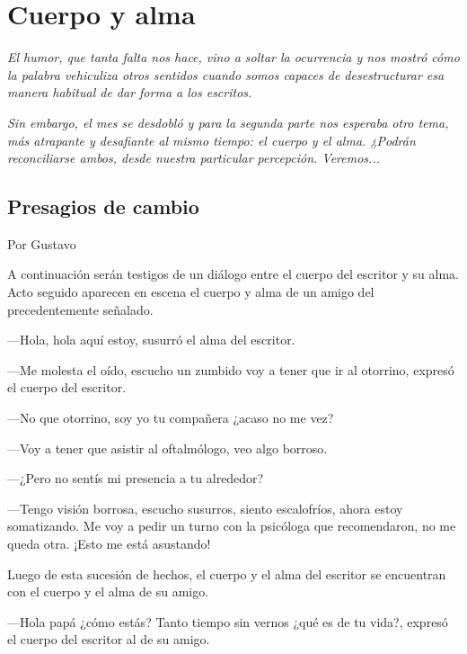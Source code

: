 \documentclass[11pt,twoside,openright,a5paper]{book}
\begin{document}
\chapter*{Cuerpo y alma}

\emph{El humor, que tanta falta nos hace, vino a soltar la ocurrencia y nos mostró cómo la palabra vehiculiza  otros sentidos cuando somos capaces de desestructurar esa manera habitual de dar forma a los escritos.}

\emph{Sin embargo, el mes se desdobló y para la segunda parte nos esperaba otro tema, más atrapante y desafiante al mismo tiempo: el cuerpo y el alma. ¿Podrán reconciliarse ambos, desde nuestra particular percepción. Veremos...}

\section*{Presagios de cambio }

                                                                                        \begin{flushright}Por Gustavo\end{flushright}
                                                                                     
A continuación serán testigos de un diálogo entre el cuerpo del escritor y su alma. Acto seguido aparecen en escena el cuerpo y alma de un amigo del precedentemente señalado.

---Hola, hola aquí estoy, susurró el alma del escritor.

---Me molesta el oído, escucho un zumbido voy a tener que ir al otorrino, expresó el cuerpo del escritor.

---No que otorrino, soy yo tu compañera ¿acaso no me vez?

---Voy a tener que asistir al oftalmólogo, veo algo borroso.

---¿Pero no sentís mi presencia a tu alrededor?

---Tengo visión borrosa, escucho susurros, siento escalofríos, ahora estoy somatizando. Me voy a pedir un turno con la psicóloga que recomendaron, no me queda otra. ¡Esto me está asustando!

Luego de esta sucesión de hechos, el cuerpo y el alma del escritor se encuentran con el cuerpo y el alma de su amigo.

---Hola papá ¿cómo estás? Tanto tiempo sin vernos ¿qué es de tu vida?, expresó el cuerpo del escritor al de su amigo.
\end{document}
